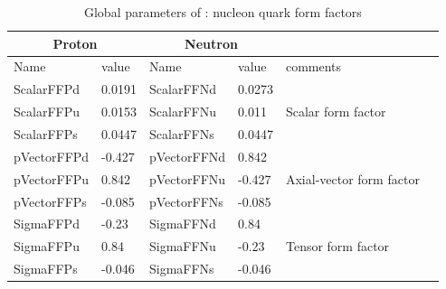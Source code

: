 \documentclass[12pt,a4paper]{article}
\begin{document}
\begin{table}[]
 \caption{Global parameters of \micro :  nucleon quark form factors}
 \label{FFTab}
\begin{center}
\begin{tabular}{|l|l|l|l|l|l|}
\hline
 \multicolumn{2}{|c|}{Proton}& \multicolumn{2}{|c|}{Neutron} & \\ \hline
  Name      &  value       &  Name      &  value     &  comments \\  \hline
ScalarFFPd  &  0.0191     &ScalarFFNd  &  0.0273  & \\
ScalarFFPu  &  0.0153     &ScalarFFNu  &  0.011 & Scalar form factor \\
ScalarFFPs  &  0.0447      &ScalarFFNs  &  0.0447   & \\
\hline
pVectorFFPd &  -0.427      &pVectorFFNd &  0.842    & \\
pVectorFFPu &   0.842      &pVectorFFNu &  -0.427   & Axial-vector form factor\\
pVectorFFPs &  -0.085      &pVectorFFNs &  -0.085   & \\
\hline
SigmaFFPd   &  -0.23       &SigmaFFNd   &  0.84     & \\
SigmaFFPu   &   0.84       &SigmaFFNu   &  -0.23    & Tensor form factor\\
SigmaFFPs   &   -0.046     &SigmaFFNs   &  -0.046   & \\
\hline
\end{tabular}
\end{center}
\end{table}
\end{document}
